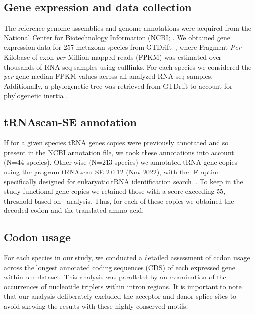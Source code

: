 \subsection{Gene expression and data collection}

The reference genome assemblies and genome annotations were acquired from the National Center for Biotechnology Information (NCBI; \citet{sayers_database_2022}.
We obtained gene expression data for 257 metazoan species from GTDrift~\citep{benitiere_gtdrift_2024}, where Fragment \textit{Per} Kilobase of exon \textit{per} Million mapped reads (FPKM) was estimated over thousands of RNA-seq samples using cufflinks. For each species we considered the \textit{per}-gene median FPKM values across all analyzed RNA-seq samples.
Additionally, a phylogenetic tree was retrieved from GTDrift to account for phylogenetic inertia \citep{benitiere_gtdrift_2024}.


\subsection{tRNAscan-SE annotation}

If for a given species tRNA genes copies were previously annotated and so present in the NCBI annotation file, we took these annotations into account (N=44 species). Other wise (N=213 species) we annotated tRNA gene copies using the program tRNAscan-SE 2.0.12 (Nov 2022), with the -E option specifically designed for eukaryotic tRNA identification search~\citep{chan_trnascan-se_2021}. To keep in the study functional gene copies we retained those with a score exceeding 55, threshold based on~\citet{chan_trnascan-se_2021} analysis. Thus, for each of these copies we obtained the decoded codon and the translated amino acid. 


\subsection{Codon usage}

For each species in our study, we conducted a detailed assessment of codon usage across the longest annotated coding sequences (CDS) of each expressed gene within our dataset. This analysis was paralleled by an examination of the occurrences of nucleotide triplets within intron regions. It is important to note that our analysis deliberately excluded the acceptor and donor splice sites to avoid skewing the results with these highly conserved motifs.


